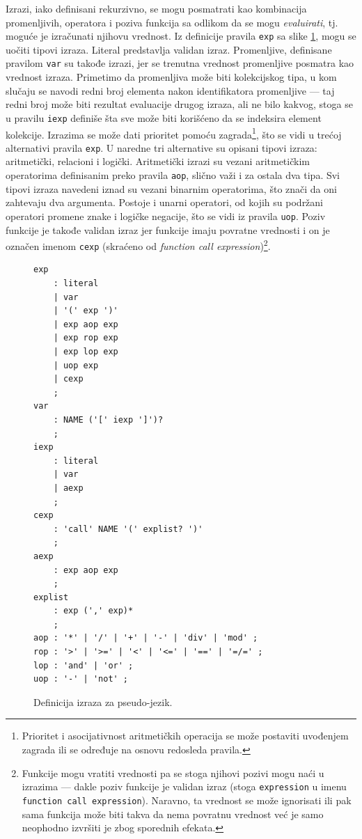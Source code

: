 Izrazi, iako definisani rekurzivno, se mogu posmatrati kao kombinacija promenljivih, operatora i poziva funkcija sa odlikom da se mogu \emph{evaluirati}, tj. moguće je izračunati njihovu vrednost. Iz definicije pravila \texttt{exp} sa slike \ref{fig:PseudoDef6}, mogu se uočiti tipovi izraza. Literal predstavlja validan izraz. Promenljive, definisane pravilom \texttt{var} su takođe izrazi, jer se trenutna vrednost promenljive posmatra kao vrednost izraza. Primetimo da promenljiva može biti kolekcijskog tipa, u kom slučaju se navodi redni broj elementa nakon identifikatora promenljive --- taj redni broj može biti rezultat evaluacije drugog izraza, ali ne bilo kakvog, stoga se u pravilu \texttt{iexp} definiše šta sve može biti korišćeno da se indeksira element kolekcije. Izrazima se može dati prioritet pomoću zagrada\footnote{Prioritet i asocijativnost aritmetičkih operacija se mo\v{z}e postaviti uvođenjem zagrada ili se određuje na osnovu redosleda pravila.}, što se vidi u trećoj alternativi pravila \texttt{exp}. U naredne tri alternative su opisani tipovi izraza: aritmetički, relacioni i logički. Aritmetički izrazi su vezani aritmetičkim operatorima definisanim preko pravila \texttt{aop}, slično važi i za ostala dva tipa. Svi tipovi izraza navedeni iznad su vezani binarnim operatorima, što znači da oni zahtevaju dva argumenta. Postoje i unarni operatori, od kojih su podržani operatori promene znake i logičke negacije, što se vidi iz pravila \texttt{uop}. Poziv funkcije je takođe validan izraz jer funkcije imaju povratne vrednosti i on je označen imenom \texttt{cexp} (skraćeno od \emph{function call expression})\footnote{Funkcije mogu vratiti vrednosti pa se stoga njihovi pozivi mogu naći u izrazima --- dakle poziv funkcije je validan izraz (stoga \texttt{expression} u imenu \texttt{function call expression}). Naravno, ta vrednost se može ignorisati ili pak sama funkcija može biti takva da nema povratnu vrednost već je samo neophodno izvršiti je zbog sporednih efekata.}.

\begin{figure}[h!]
\begin{lstlisting}[language={}]
exp
    : literal 
    | var
    | '(' exp ')'
    | exp aop exp
    | exp rop exp
    | exp lop exp
    | uop exp
    | cexp
    ;
var 
    : NAME ('[' iexp ']')?
    ;
iexp 
    : literal
    | var
    | aexp
    ;
cexp
    : 'call' NAME '(' explist? ')'
    ;
aexp
	: exp aop exp
	;
explist
    : exp (',' exp)*
    ;
aop : '*' | '/' | '+' | '-' | 'div' | 'mod' ;
rop : '>' | '>=' | '<' | '<=' | '==' | '=/=' ;
lop : 'and' | 'or' ;
uop : '-' | 'not' ;
\end{lstlisting}
\caption{Definicija izraza za pseudo-jezik.}
\label{fig:PseudoDef6}
\end{figure}

